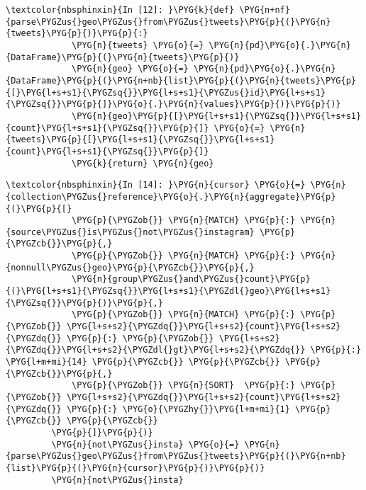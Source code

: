 \documentclass[letterpaper,10pt,english]{sphinxmanual}
\begin{document}
%
\begin{Verbatim}[commandchars=\\\{\}]
\textcolor{nbsphinxin}{In [12]: }\PYG{k}{def} \PYG{n+nf}{parse\PYGZus{}geo\PYGZus{}from\PYGZus{}tweets}\PYG{p}{(}\PYG{n}{tweets}\PYG{p}{)}\PYG{p}{:}
             \PYG{n}{tweets} \PYG{o}{=} \PYG{n}{pd}\PYG{o}{.}\PYG{n}{DataFrame}\PYG{p}{(}\PYG{n}{tweets}\PYG{p}{)}
             \PYG{n}{geo} \PYG{o}{=} \PYG{n}{pd}\PYG{o}{.}\PYG{n}{DataFrame}\PYG{p}{(}\PYG{n+nb}{list}\PYG{p}{(}\PYG{n}{tweets}\PYG{p}{[}\PYG{l+s+s1}{\PYGZsq{}}\PYG{l+s+s1}{\PYGZus{}id}\PYG{l+s+s1}{\PYGZsq{}}\PYG{p}{]}\PYG{o}{.}\PYG{n}{values}\PYG{p}{)}\PYG{p}{)}
             \PYG{n}{geo}\PYG{p}{[}\PYG{l+s+s1}{\PYGZsq{}}\PYG{l+s+s1}{count}\PYG{l+s+s1}{\PYGZsq{}}\PYG{p}{]} \PYG{o}{=} \PYG{n}{tweets}\PYG{p}{[}\PYG{l+s+s1}{\PYGZsq{}}\PYG{l+s+s1}{count}\PYG{l+s+s1}{\PYGZsq{}}\PYG{p}{]}
             \PYG{k}{return} \PYG{n}{geo}
\end{Verbatim}

%
\begin{Verbatim}[commandchars=\\\{\}]
\textcolor{nbsphinxin}{In [14]: }\PYG{n}{cursor} \PYG{o}{=} \PYG{n}{collection\PYGZus{}reference}\PYG{o}{.}\PYG{n}{aggregate}\PYG{p}{(}\PYG{p}{[}
             \PYG{p}{\PYGZob{}} \PYG{n}{MATCH} \PYG{p}{:} \PYG{n}{source\PYGZus{}is\PYGZus{}not\PYGZus{}instagram} \PYG{p}{\PYGZcb{}}\PYG{p}{,}
             \PYG{p}{\PYGZob{}} \PYG{n}{MATCH} \PYG{p}{:} \PYG{n}{nonnull\PYGZus{}geo}\PYG{p}{\PYGZcb{}}\PYG{p}{,}
             \PYG{n}{group\PYGZus{}and\PYGZus{}count}\PYG{p}{(}\PYG{l+s+s1}{\PYGZsq{}}\PYG{l+s+s1}{\PYGZdl{}geo}\PYG{l+s+s1}{\PYGZsq{}}\PYG{p}{)}\PYG{p}{,}
             \PYG{p}{\PYGZob{}} \PYG{n}{MATCH} \PYG{p}{:} \PYG{p}{\PYGZob{}} \PYG{l+s+s2}{\PYGZdq{}}\PYG{l+s+s2}{count}\PYG{l+s+s2}{\PYGZdq{}} \PYG{p}{:} \PYG{p}{\PYGZob{}} \PYG{l+s+s2}{\PYGZdq{}}\PYG{l+s+s2}{\PYGZdl{}gt}\PYG{l+s+s2}{\PYGZdq{}} \PYG{p}{:} \PYG{l+m+mi}{14} \PYG{p}{\PYGZcb{}} \PYG{p}{\PYGZcb{}} \PYG{p}{\PYGZcb{}}\PYG{p}{,}
             \PYG{p}{\PYGZob{}} \PYG{n}{SORT}  \PYG{p}{:} \PYG{p}{\PYGZob{}} \PYG{l+s+s2}{\PYGZdq{}}\PYG{l+s+s2}{count}\PYG{l+s+s2}{\PYGZdq{}} \PYG{p}{:} \PYG{o}{\PYGZhy{}}\PYG{l+m+mi}{1} \PYG{p}{\PYGZcb{}} \PYG{p}{\PYGZcb{}}
         \PYG{p}{]}\PYG{p}{)}
         \PYG{n}{not\PYGZus{}insta} \PYG{o}{=} \PYG{n}{parse\PYGZus{}geo\PYGZus{}from\PYGZus{}tweets}\PYG{p}{(}\PYG{n+nb}{list}\PYG{p}{(}\PYG{n}{cursor}\PYG{p}{)}\PYG{p}{)}
         \PYG{n}{not\PYGZus{}insta}
\end{Verbatim}
\end{document}
